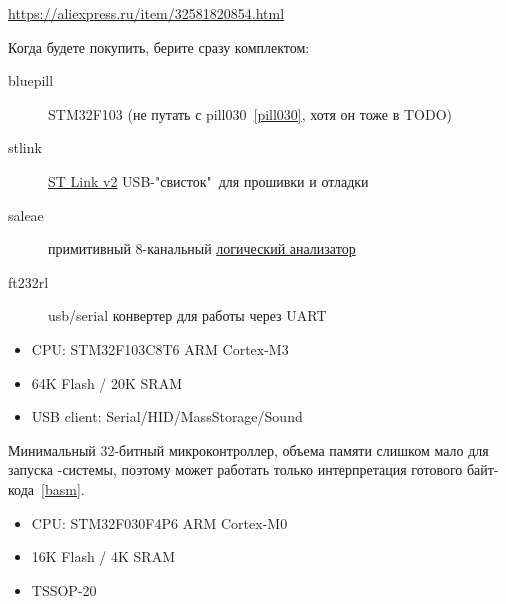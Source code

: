 \clearpage
{}\label{pill103}\secdown

\url{https://aliexpress.ru/item/32581820854.html}

\bigskip\noindent
Когда будете покупить, берите сразу комплектом:
\begin{description}
    \item[bluepill] STM32F103 (не путать с pill030\ \ref{pill030}, хотя он тоже в TODO)
    \item[stlink] \href{https://aliexpress.ru/item/32719963657.html}{ST Link v2}
    USB-"свисток"\ для прошивки и отладки
    \item[saleae] примитивный 8-канальный
    \href{https://aliexpress.ru/item/4000192339928.html}{логический анализатор}
    \item[ft232rl] usb/serial конвертер для работы через UART
\end{description}

\begin{itemize}[nosep]
    \item CPU: STM32F103C8T6 ARM Cortex-M3
    \item 64K Flash / 20K SRAM
    \item USB client: Serial/HID/MassStorage/Sound
\end{itemize}

\clearpage
{}

\secup

\clearpage
{}\label{pill030}\secdown

\noindent
Минимальный 32-битный микроконтроллер, объема памяти слишком мало для запуска
\F-системы, поэтому может работать только интерпретация готового байт-кода\
\ref{basm}.

\medskip
\begin{itemize}[nosep]
    \item CPU: STM32F030F4P6 ARM Cortex-M0
    \item 16K Flash / 4K SRAM
    \item TSSOP-20
\end{itemize}

\clearpage
{}

\secup

